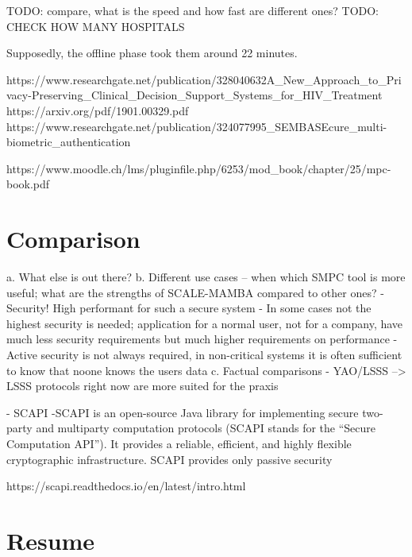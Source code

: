 \documentclass[english,runningheads,a4paper]{llncs}[2018/03/10]
\begin{document}
TODO: compare, what is the speed and how fast are different ones? 
TODO: CHECK HOW MANY HOSPITALS


Supposedly, the offline phase took them around 22 minutes. 




https://www.researchgate.net/publication/328040632A\_New\_Approach\_to\_Privacy-Preserving\_Clinical\_Decision\_Support\_Systems\_for\_HIV\_Treatment
https://arxiv.org/pdf/1901.00329.pdf
https://www.researchgate.net/publication/324077995\_SEMBASEcure\_multi-biometric\_authentication

https://www.moodle.ch/lms/pluginfile.php/6253/mod\_book/chapter/25/mpc-book.pdf

\section{Comparison}\label{sec:comparison}


a.	What else is out there?
b.	Different use cases – when which SMPC tool is more useful; what are the strengths of SCALE-MAMBA compared to other ones?
	- Security! High performant for such a secure system
	- In some cases not the highest security is needed; application for a normal user, not for a company, have much less security requirements but much higher requirements on performance
	- Active security is not always required, in non-critical systems it is often sufficient to know that noone knows the users data
c.	Factual comparisons
	- YAO/LSSS --> LSSS protocols right now are more suited for the praxis

	- SCAPI
	-SCAPI is an open-source Java library for implementing secure two-party and multiparty computation protocols (SCAPI stands for the “Secure Computation API”). It provides a reliable, 	efficient, and highly flexible cryptographic infrastructure.
SCAPI provides only passive security

https://scapi.readthedocs.io/en/latest/intro.html


\section{Resume}\label{sec:outlook}
\end{document}
